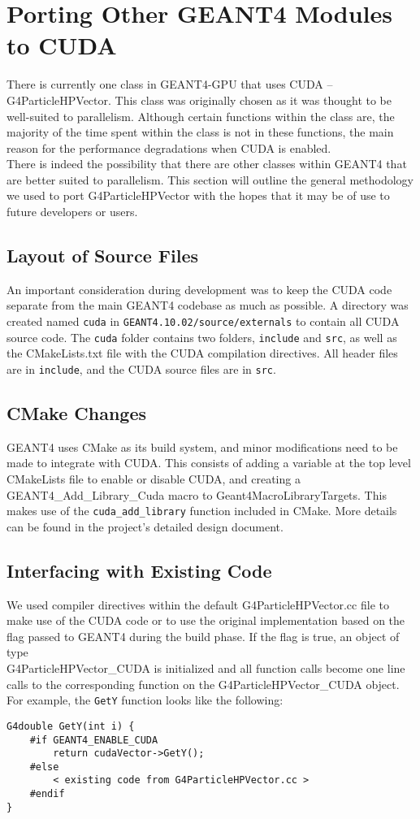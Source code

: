 \documentclass[12pt]{article}
\begin{document}
\section{Porting Other GEANT4 Modules to CUDA} \label{SecDev} %
There is currently one class in GEANT4-GPU that uses CUDA -- G4ParticleHPVector. This class was originally chosen as it was thought to be well-suited to parallelism. Although certain functions within the class are, the majority of the time spent within the class is not in these functions, the main reason for the performance degradations when CUDA is enabled.\\

There is indeed the possibility that there are other classes within GEANT4 that are better suited to parallelism. This section will outline the general methodology we used to port G4ParticleHPVector with the hopes that it may be of use to future developers or users.

\subsection{Layout of Source Files} %
An important consideration during development was to keep the CUDA code separate from the main GEANT4 codebase as much as possible. A directory was created named \texttt{cuda} in \texttt{GEANT4.10.02/source/externals} to contain all CUDA source code. The \texttt{cuda} folder contains two folders, \texttt{include} and \texttt{src}, as well as the CMakeLists.txt file with the CUDA compilation directives. All header files are in \texttt{include}, and the CUDA source files are in \texttt{src}.

\subsection{CMake Changes} %
GEANT4 uses CMake as its build system, and minor modifications need to be made to integrate with CUDA. This consists of adding a variable at the top level CMakeLists file to enable or disable CUDA, and creating a {GEANT4\_Add\_Library\_Cuda} macro to Geant4MacroLibraryTargets. This makes use of the \texttt{cuda\_add\_library} function included in CMake. More details can be found in the project's detailed design document.

\subsection{Interfacing with Existing Code} %
We used compiler directives within the default G4ParticleHPVector.cc file to make use of the CUDA code or to use the original implementation based on the flag passed to GEANT4 during the build phase. If the flag is true, an object of type \\G4ParticleHPVector\_CUDA is initialized and all function calls become one line calls to the corresponding function on the G4ParticleHPVector\_CUDA object. For example, the \texttt{GetY} function looks like the following:
\begin{lstlisting}
G4double GetY(int i) {
	#if GEANT4_ENABLE_CUDA
		return cudaVector->GetY();
	#else
		< existing code from G4ParticleHPVector.cc >
	#endif
}
\end{lstlisting}
\end{document}
